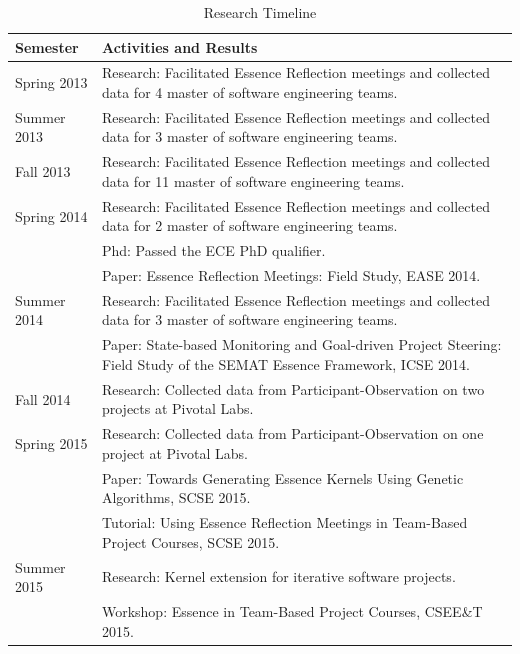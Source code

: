 \documentclass[preprint,12pt,3p]{elsarticle}
\begin{document}
\begin{table}[h]
\caption{Research Timeline}
\label{ResearchTimeline}
\centering
\begin{tabular}{|p{1.00in}|p{5.00in}|}
\hline
Semester    & Activities and Results  \\ \hline
Spring 2013 & Research: Facilitated Essence Reflection meetings and collected data for 4 master of software engineering teams. \\ \hline
Summer 2013 & Research: Facilitated Essence Reflection meetings and collected data for 3 master of software engineering teams.  \\ \hline
Fall 2013   & Research: Facilitated Essence Reflection meetings and collected data for 11 master of software engineering teams.  \\ \hline
Spring 2014 & Research: Facilitated Essence Reflection meetings and collected data for 2 master of software engineering teams.\\ 
            & Phd: Passed the ECE PhD qualifier.\\ 
            & Paper: Essence Reflection Meetings: Field Study, EASE 2014. \\ \hline
Summer 2014 & Research: Facilitated Essence Reflection meetings and collected data for 3 master of software engineering teams.\\ 
            & Paper: State-based Monitoring and Goal-driven Project Steering: Field Study of the SEMAT Essence Framework, ICSE 2014. \\ \hline
Fall 2014   & Research: Collected data from Participant-Observation on two projects at Pivotal Labs.  \\ \hline
Spring 2015 & Research: Collected data from Participant-Observation on one project at Pivotal Labs.\\ 
            & Paper: Towards Generating Essence Kernels Using Genetic Algorithms, SCSE 2015.\\ 
            & Tutorial: Using Essence Reflection Meetings in Team-Based Project Courses, SCSE 2015. \\ \hline
Summer 2015 & Research: Kernel extension for iterative software projects.\\ 
            & Workshop: Essence in Team-Based Project Courses, CSEE\&T 2015. \\ \hline                     
\end{tabular}
\end{table}
\end{document}
